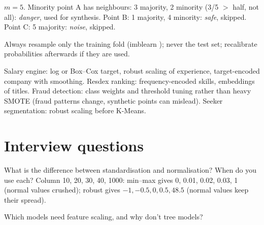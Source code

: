 \begin{example}
$m = 5$. Minority point A has neighbours: 3 majority, 2 minority (3/5 $>$ half, not all): \emph{danger}, used for synthesis. Point B: 1 majority, 4 minority: \emph{safe},
skipped. Point C: 5 majority: \emph{noise}, skipped.
\end{example}
Always resample only the training fold (imblearn ); never the test set; recalibrate probabilities afterwards if they are used.

\begin{practical}
Salary engine: log or Box--Cox target, robust scaling of experience, target-encoded company with smoothing. Resdex ranking: frequency-encoded skills, embeddings of titles.
Fraud detection: class weights and threshold tuning rather than heavy SMOTE (fraud patterns change, synthetic points can mislead). Seeker segmentation: robust scaling before
K-Means.
\end{practical}

\section{Interview questions}

\begin{qa}{What is the difference between standardisation and normalisation? When do you use each?}
\worked Column 10, 20, 30, 40, 1000: min--max gives 0, 0.01, 0.02, 0.03, 1 (normal values crushed); robust gives $-1, -0.5, 0, 0.5, 48.5$ (normal values keep their spread).
\end{qa}

\begin{qa}{Which models need feature scaling, and why don't tree models?}
\end{qa}


